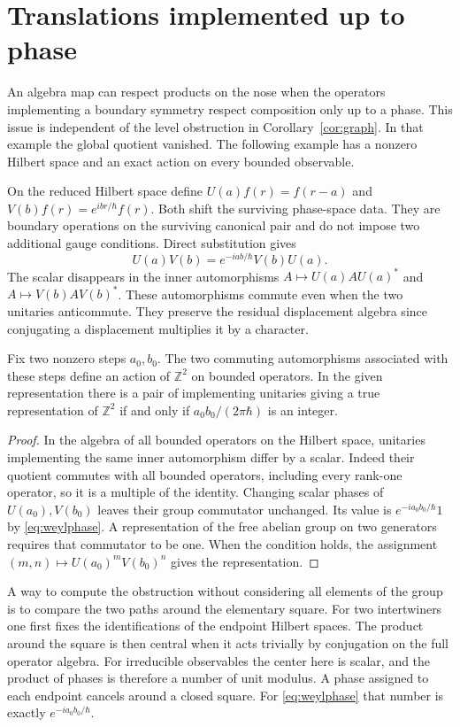 \documentclass[11pt,letterpaper]{article}
\begin{document}
\section{Translations implemented up to phase}
\label{sec:phases}
An algebra map can respect products on the nose when the operators implementing a boundary
symmetry respect composition only up to a phase. This issue is independent of the level
obstruction in Corollary~\ref{cor:graph}. In that example the global quotient vanished. The
following example has a nonzero Hilbert space and an exact action on every bounded observable.

On the reduced Hilbert space define $U(a)f(r)=f(r-a)$ and $V(b)f(r)=e^{ibr/\hbar}f(r)$. Both
shift the surviving phase-space data. They are boundary operations on the surviving canonical
pair and do not impose two additional gauge conditions. Direct substitution gives
\begin{equation}
 U(a)V(b)=e^{-iab/\hbar} V(b)U(a).
 \label{eq:weylphase}
\end{equation}
The scalar disappears in the inner automorphisms $A\mapsto U(a)AU(a)^*$ and $A\mapsto
V(b)AV(b)^*$. These automorphisms commute even when the two unitaries anticommute. They
preserve the residual displacement algebra since conjugating a displacement multiplies it by a
character.

\begin{proposition}\label{prop:phase}
Fix two nonzero steps $a_0,b_0$. The two commuting automorphisms associated with these steps
define an action of $\mathbb Z^2$ on bounded operators. In the given representation there is a
pair of implementing unitaries giving a true representation of $\mathbb Z^2$ if and only if
$a_0b_0/(2\pi\hbar)$ is an integer.
\end{proposition}
\begin{proof}
In the algebra of all bounded operators on the Hilbert space, unitaries implementing the same
inner automorphism differ by a scalar. Indeed their quotient commutes with all bounded
operators, including every rank-one operator, so it is a multiple of the identity. Changing
scalar phases of $U(a_0),V(b_0)$ leaves their group commutator unchanged. Its value is
$e^{-ia_0b_0/\hbar}1$ by \eqref{eq:weylphase}. A representation of the free abelian group on
two generators requires that commutator to be one. When the condition holds, the assignment
$(m,n)\mapsto U(a_0)^m V(b_0)^n$ gives the representation.
\end{proof}

A way to compute the obstruction without considering all elements of the group is to compare
the two paths around the elementary square. For two intertwiners one first fixes the
identifications of the endpoint Hilbert spaces. The product around the square is then central
when it acts trivially by conjugation on the full operator algebra. For irreducible observables
the center here is scalar, and the product of phases is therefore a number of unit modulus. A
phase assigned to each endpoint cancels around a closed square. For \eqref{eq:weylphase} that
number is exactly $e^{-ia_0 b_0/\hbar}$.
\end{document}
